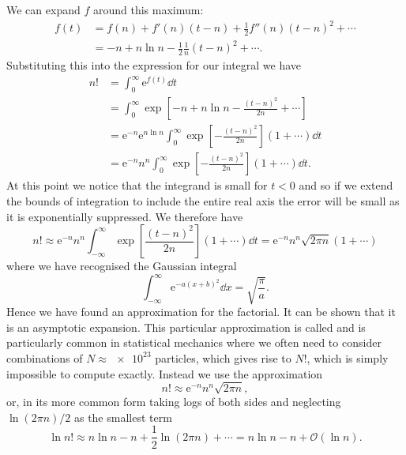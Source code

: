\documentclass[fleqn]{NotesClass}
\newcommand*{\e}{\mathrm{e}}
\newcommand*{\order}{\mathcal{O}}
\begin{document}
    We can expand \(f\) around this maximum:
    \begin{align}
        f(t) &= f(n) + f'(n)(t - n) + \frac{1}{2}f''(n)(t - n)^2 + \dotsb\\
        &= -n + n\ln n - \frac{1}{2}\frac{1}{n}(t - n)^2 + \dotsb.
    \end{align}
    Substituting this into the expression for our integral we have
    \begin{align}
        n! &= \int_{0}^{\infty} \e^{f(t)} \dd{t}\\
        &= \int_0^{\infty} \exp\left[ -n + n\ln n - \frac{(t - n)^2}{2n} + \dotsb \right]\\
        &= \e^{-n}\e^{n\ln n} \int_{0}^{\infty} \exp[-\frac{(t - n)^2}{2n}](1 + \dotsb)\dd{t}\\
        &= \e^{-n}n^n \int_{0}^{\infty} \exp[-\frac{(t - n)^2}{2n}](1 + \dotsb)\dd{t}.
    \end{align}
    At this point we notice that the integrand is small for \(t < 0\) and so if we extend the bounds of integration to include the entire real axis the error will be small as it is exponentially suppressed.
    We therefore have
    \begin{equation}
        n! \approx \e^{-n}n^{n} \int_{-\infty}^{\infty} \exp[\frac{(t - n)^2}{2n}](1 + \dotsb)\dd{t} = \e^{-n}n^n \sqrt{2\pi n}(1 + \dotsb)
    \end{equation}
    where we have recognised the Gaussian integral
    \begin{equation}
        \int_{-\infty}^{\infty} \e^{-a(x + b)^2} \dd{x} = \sqrt{\frac{\pi}{a}}.
    \end{equation}
    Hence we have found an approximation for the factorial.
    It can be shown that it is an asymptotic expansion.
    This particular approximation is called  and is particularly common in statistical mechanics where we often need to consider combinations of \(N \approx \num{e23}\) particles, which gives rise to \(N!\), which is simply impossible to compute exactly.
    Instead we use the approximation
    \begin{equation}
        n! \approx \e^{-n}n^n \sqrt{2\pi n},
    \end{equation}
    or, in its more common form taking logs of both sides and neglecting \(\ln(2\pi n)/2\) as the smallest term
    \begin{equation}
        \ln n! \approx n \ln n - n + \frac{1}{2}\ln(2\pi n) + \dotsb = n\ln n - n + \order(\ln n).
    \end{equation}
    
\end{document}
